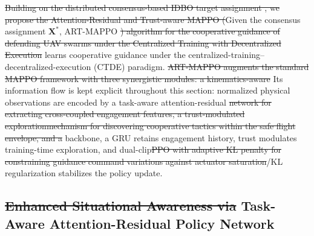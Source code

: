 \documentclass[lettersize,journal]{IEEEtran}
\providecommand{\DIFadd}[1]{{\protect\color{blue}#1}} %
\providecommand{\DIFdel}[1]{{\protect\color{red}\sout{#1}}}                      %
\providecommand{\DIFaddbegin}{} %
\providecommand{\DIFaddend}{} %
\providecommand{\DIFdelbegin}{} %
\providecommand{\DIFdelend}{} %
\newcommand{\DIFscaledelfig}{0.5}
\newlength{\DIFdelgraphicswidth} %
\newlength{\DIFdelgraphicsheight} %
\newcommand{\DIFaddincludegraphics}[2][]{{\color{blue}\fbox{\DIFOincludegraphics[#1]{#2}}}} %
\newcommand{\DIFdelincludegraphics}[2][]{%
\sbox{\DIFdelgraphicsbox}{\DIFOincludegraphics[#1]{#2}}%
\settoboxwidth{\DIFdelgraphicswidth}{\DIFdelgraphicsbox} %
\settoboxtotalheight{\DIFdelgraphicsheight}{\DIFdelgraphicsbox} %
\scalebox{\DIFscaledelfig}{%
\parbox[b]{\DIFdelgraphicswidth}{\usebox{\DIFdelgraphicsbox}\\[-\baselineskip] \rule{\DIFdelgraphicswidth}{0em}}\llap{\resizebox{\DIFdelgraphicswidth}{\DIFdelgraphicsheight}{%
\setlength{\unitlength}{\DIFdelgraphicswidth}%
\begin{picture}(1,1)%
\thicklines\linethickness{2pt} %
{\color[rgb]{1,0,0}\put(0,0){\framebox(1,1){}}}%
{\color[rgb]{1,0,0}\put(0,0){\line( 1,1){1}}}%
{\color[rgb]{1,0,0}\put(0,1){\line(1,-1){1}}}%
\end{picture}%
}\hspace*{3pt}}} %
} %
\DeclareRobustCommand{\DIFaddbegin}{\DIFOaddbegin \let\includegraphics\DIFaddincludegraphics} %
\DeclareRobustCommand{\DIFaddend}{\DIFOaddend \let\includegraphics\DIFOincludegraphics} %
\DeclareRobustCommand{\DIFdelbegin}{\DIFOdelbegin \let\includegraphics\DIFdelincludegraphics} %
\DeclareRobustCommand{\DIFdelend}{\DIFOaddend \let\includegraphics\DIFOincludegraphics} %
\begin{document}
\DIFdelbegin \DIFdel{Building on the distributed consensus-based IDBO target assignment , we propose the Attention-Residual and Trust-aware MAPPO (}\DIFdelend \DIFaddbegin \DIFadd{Given the consensus assignment $\mathbf X^{*}$, }\DIFaddend ART-MAPPO \DIFdelbegin \DIFdel{) algorithm for the cooperative guidance of defending UAV swarms under
the Centralized Training with Decentralized Execution }\DIFdelend \DIFaddbegin \DIFadd{learns cooperative guidance under
the centralized-training--decentralized-execution }\DIFaddend (CTDE) paradigm. \DIFdelbegin \DIFdel{ART-MAPPO augments the standard MAPPO framework with three synergistic modules: a kinematics-aware }\DIFdelend \DIFaddbegin \DIFadd{Its information flow is
kept explicit throughout this section: normalized physical observations are encoded by a
task-aware }\DIFaddend attention-residual \DIFdelbegin \DIFdel{network for extracting cross-coupled engagement features, a trust-modulated explorationmechanism for discovering cooperative tactics within the safe flight envelope, and a }\DIFdelend \DIFaddbegin \DIFadd{backbone, a GRU retains engagement history, trust modulates
training-time exploration, and }\DIFaddend dual-clip\DIFdelbegin \DIFdel{PPO with adaptive KL penalty for constraining guidance command variations against actuator saturation}\DIFdelend \DIFaddbegin \DIFadd{/KL regularization stabilizes the policy update}\DIFaddend .

\subsection{\DIFdelbegin \DIFdel{Enhanced Situational Awareness via }\DIFdelend \DIFaddbegin \DIFadd{Task-Aware }\DIFaddend Attention-Residual \DIFaddbegin \DIFadd{Policy }\DIFaddend Network}
\label{subsec:attention_residual}
\end{document}
